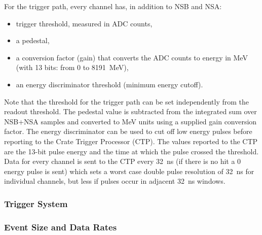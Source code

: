 For the trigger path, every channel has, in addition to NSB and NSA: 
\begin{itemize}
 \item trigger threshold, measured in ADC counts, 
 \item a pedestal, 
 \item a conversion factor (gain) that converts the ADC counts to energy in MeV (with 13 bits:  from 0 to 8191~MeV), 
 \item an energy discriminator threshold (minimum energy cutoff).
 \end{itemize}
Note that the threshold for the trigger path can be set independently from the readout threshold.
The pedestal value is subtracted from the integrated sum over NSB+NSA samples and 
converted to MeV units using a supplied gain conversion factor. The energy discriminator can be used to cut off low energy pulses before reporting to the Crate Trigger Processor (CTP). 
The values reported to the CTP are the 13-bit pulse energy and the time at which the pulse crossed the threshold. 
Data for every channel is sent to the CTP every 32~ns (if there is no hit a 0 energy pulse is sent) which sets a worst case double pulse resolution of 32~ns for individual channels, but less if pulses occur in adjacent 32~ns windows.







\subsubsection{Trigger System}
\label{sec:triggerdaq}


\subsubsection{Event Size and Data Rates}

